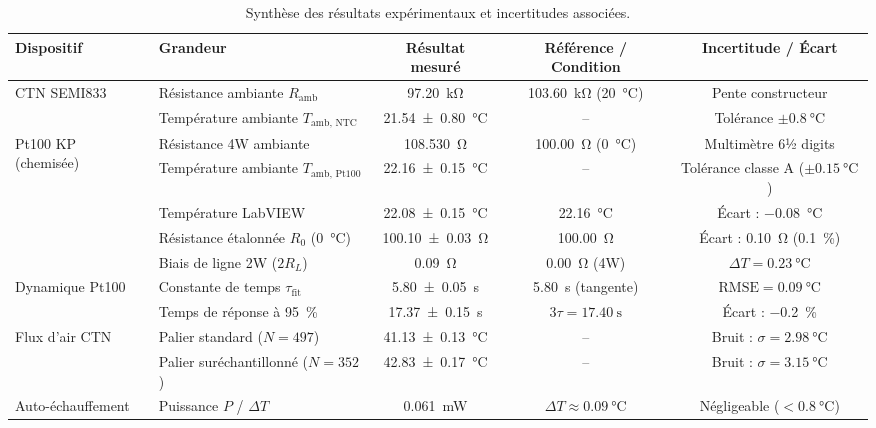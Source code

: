 \begin{table}[H]
  \centering
  \footnotesize
  \setlength{\tabcolsep}{3pt}
  \renewcommand{\arraystretch}{1.1}
  \begin{tabularx}{\textwidth}{l >{\raggedright\arraybackslash}X c c c}
    \toprule
    \textbf{Dispositif} & \textbf{Grandeur} & \textbf{Résultat mesuré} & \textbf{Référence / Condition} & \textbf{Incertitude / Écart} \\
    \midrule
    \multirow{2}{*}{CTN SEMI833} & Résistance ambiante $R_{\text{amb}}$ & \qty{97.20}{\kilo\ohm} & \qty{103.60}{\kilo\ohm} (\qty{20}{\degreeCelsius}) & Pente constructeur \\
     & Température ambiante $T_{\text{amb, NTC}}$ & \qty{21.54 \pm 0.80}{\degreeCelsius} & -- & Tolérance $\pm \qty{0.8}{\degreeCelsius}$ \\
    \midrule
    \multirow{5}{*}{Pt100 KP (chemisée)} & Résistance 4W ambiante & \qty{108.530}{\ohm} & \qty{100.00}{\ohm} (\qty{0}{\degreeCelsius}) & Multimètre 6½ digits \\
     & Température ambiante $T_{\text{amb, Pt100}}$ & \qty{22.16 \pm 0.15}{\degreeCelsius} & -- & Tolérance classe A ($\pm \qty{0.15}{\degreeCelsius}$) \\
     & Température LabVIEW & \qty{22.08 \pm 0.15}{\degreeCelsius} & \qty{22.16}{\degreeCelsius} & Écart : \qty{-0.08}{\degreeCelsius} \\
     & Résistance étalonnée $R_0$ (\qty{0}{\degreeCelsius}) & \qty{100.10 \pm 0.03}{\ohm} & \qty{100.00}{\ohm} & Écart : \qty{+0.10}{\ohm} (\qty{+0.1}{\percent}) \\
     & Biais de ligne 2W ($2 R_L$) & \qty{0.09}{\ohm} & \qty{0.00}{\ohm} (4W) & $\Delta T = \qty{+0.23}{\degreeCelsius}$ \\
    \midrule
    \multirow{2}{*}{Dynamique Pt100} & Constante de temps $\tau_{\text{fit}}$ & \qty{5.80 \pm 0.05}{\second} & \qty{5.80}{\second} (tangente) & $\text{RMSE} = \qty{0.09}{\degreeCelsius}$ \\
     & Temps de réponse à \qty{95}{\percent} & \qty{17.37 \pm 0.15}{\second} & $3\tau = \qty{17.40}{\second}$ & Écart : \qty{-0.2}{\percent} \\
    \midrule
    \multirow{2}{*}{Flux d'air CTN} & Palier standard ($N=497$) & \qty{41.13 \pm 0.13}{\degreeCelsius} & -- & Bruit : $\sigma = \qty{2.98}{\degreeCelsius}$ \\
     & Palier suréchantillonné ($N=352$) & \qty{42.83 \pm 0.17}{\degreeCelsius} & -- & Bruit : $\sigma = \qty{3.15}{\degreeCelsius}$ \\
    \midrule
    Auto-échauffement & Puissance $P$ / $\Delta T$ & \qty{0.061}{\milli\watt} & $\Delta T \approx \qty{0.09}{\degreeCelsius}$ & Négligeable ($< \qty{0.8}{\degreeCelsius}$) \\
    \bottomrule
  \end{tabularx}
  \caption{Synthèse des résultats expérimentaux et incertitudes associées.}
  \label{tab:recap-labo}
\end{table}

